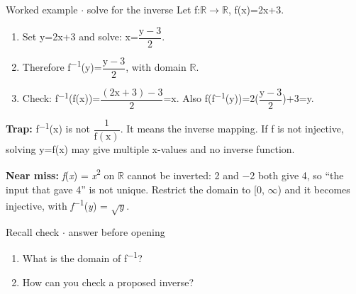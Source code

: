 \documentclass[11pt]{article}
\begin{document}
\begin{keepsection}
\begin{workedbox}{Worked example \ensuremath{\cdot} solve for the inverse}
Let f:\ensuremath{\mathbb{R}}\ensuremath{\to}\ensuremath{\mathbb{R}}, f(x)=2x+3.

\begin{enumerate}
\item Set y=2x+3 and solve: x={\small\ensuremath{\dfrac{\mathrm{y}-3}{2}}}.
\item Therefore f\textsuperscript{\ensuremath{-}1}(y)={\small\ensuremath{\dfrac{\mathrm{y}-3}{2}}}, with domain \ensuremath{\mathbb{R}}.
\item Check: f\textsuperscript{\ensuremath{-}1}(f(x))={\small\ensuremath{\dfrac{(2\mathrm{x}+3)-3}{2}}}=x. Also f(f\textsuperscript{\ensuremath{-}1}(y))=2({\small\ensuremath{\dfrac{\mathrm{y}-3}{2}}})+3=y.
\end{enumerate}
\end{workedbox}

\begin{notebox}\textbf{Trap:} f\textsuperscript{\ensuremath{-}1}(x) is not {\small\ensuremath{\dfrac{1}{\mathrm{f}(\mathrm{x})}}}. It means the inverse mapping. If f is not injective, solving y=f(x) may give multiple x-values and no inverse function.\end{notebox}

\begin{notebox}\textbf{Near miss:} \textit{f}(\textit{x}) = \textit{x}\textsuperscript{2} on \ensuremath{\mathbb{R}} cannot be inverted: 2 and \ensuremath{-}2 both give 4, so “the input that gave 4” is not unique. Restrict the domain to [0, \ensuremath{\infty}) and it becomes injective, with \textit{f}\textsuperscript{\ensuremath{-}1}(\textit{y}) = \ensuremath{\sqrt{{y}}}.\end{notebox}

\begin{recallbox}{Recall check \ensuremath{\cdot} answer before opening}
\begin{enumerate}
\item What is the domain of f\textsuperscript{\ensuremath{-}1}?
\item How can you check a proposed inverse?
\end{enumerate}

\end{recallbox}
\end{keepsection}
\end{document}
